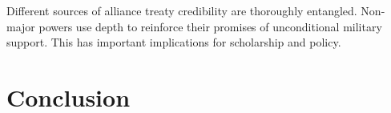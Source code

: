 \documentclass[12pt]{article}
\begin{document}
Different sources of alliance treaty credibility are thoroughly entangled. 
Non-major powers use depth to reinforce their promises of unconditional military support. 
This has important implications for scholarship and policy. 

\section{Conclusion}




\singlespace
 
 
\end{document}
